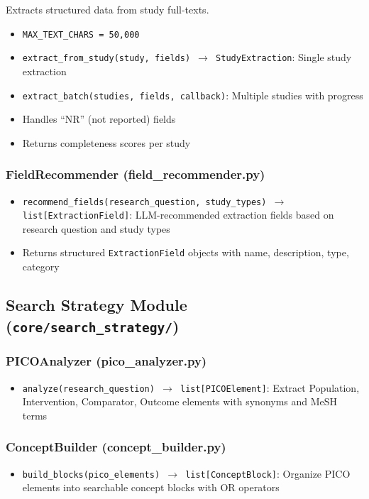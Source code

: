 \documentclass[11pt,a4paper]{article}
\begin{document}
Extracts structured data from study full-texts.

\begin{itemize}[nosep]
  \item \texttt{MAX\_TEXT\_CHARS = 50,000}
  \item \texttt{extract\_from\_study(study, fields) $\to$ StudyExtraction}: Single study extraction
  \item \texttt{extract\_batch(studies, fields, callback)}: Multiple studies with progress
  \item Handles ``NR'' (not reported) fields
  \item Returns completeness scores per study
\end{itemize}

\subsubsection{FieldRecommender (field\_recommender.py)}

\begin{itemize}[nosep]
  \item \texttt{recommend\_fields(research\_question, study\_types) $\to$ list[ExtractionField]}: LLM-recommended extraction fields based on research question and study types
  \item Returns structured \texttt{ExtractionField} objects with name, description, type, category
\end{itemize}

\subsection{Search Strategy Module (\texttt{core/search\_strategy/})}

\subsubsection{PICOAnalyzer (pico\_analyzer.py)}
\begin{itemize}[nosep]
  \item \texttt{analyze(research\_question) $\to$ list[PICOElement]}: Extract Population, Intervention, Comparator, Outcome elements with synonyms and MeSH terms
\end{itemize}

\subsubsection{ConceptBuilder (concept\_builder.py)}
\begin{itemize}[nosep]
  \item \texttt{build\_blocks(pico\_elements) $\to$ list[ConceptBlock]}: Organize PICO elements into searchable concept blocks with OR operators
\end{itemize}
\end{document}
